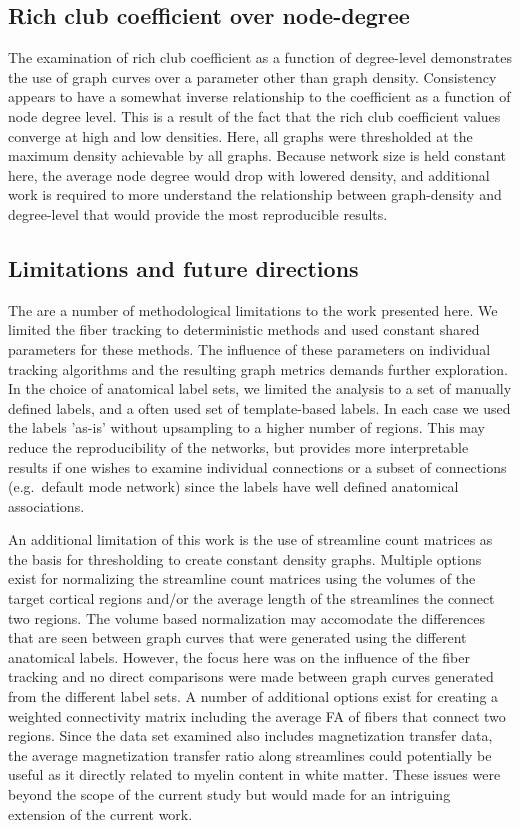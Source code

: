 \documentclass{frontiersSCNS} %
\begin{document}
\subsection{Rich club coefficient over node-degree}
The examination of rich club coefficient as a function of degree-level demonstrates the use of graph curves over 
a parameter other than graph density. Consistency appears to have a somewhat inverse relationship to the 
coefficient as a function of node degree level. This is a result of the fact that the rich club coefficient values converge
at high and low densities. Here, all graphs were thresholded at the maximum density achievable by all graphs. 
Because network size is held constant here, the average node degree would drop with lowered density, 
and additional work is required to more understand the relationship between graph-density and degree-level that 
would provide the most reproducible results. 

\subsection{Limitations and future directions}
The are a number of methodological limitations to the work presented here. We limited the fiber tracking to deterministic
methods and used constant shared parameters for these methods. The influence of these parameters on individual 
tracking algorithms and the resulting graph metrics demands further exploration. In the choice of anatomical label sets, we
limited the analysis to a set of manually defined labels, and a often used set of template-based labels. In each case we used the labels
'as-is' without upsampling to a higher number of regions. This may reduce the reproducibility of the networks, but provides
more interpretable results if one wishes to examine individual connections or a subset of connections (e.g.\ default mode network)
since the labels have well defined anatomical associations.

An additional limitation of this work is the use of streamline count matrices as the basis for thresholding to create constant
density graphs. Multiple options exist for normalizing the streamline count matrices using the volumes of 
the target cortical regions and/or the average length of the streamlines the connect two regions. The volume based
normalization may accomodate the differences that are seen between graph curves that were generated using 
the different anatomical labels. However, the focus here was on the influence of the fiber tracking and no direct
comparisons were made between graph curves generated from the different label sets. A number of additional options
exist for creating a weighted connectivity matrix including the average FA of fibers that connect two regions. Since the data set
examined also includes magnetization transfer data, the average magnetization transfer ratio along streamlines 
could potentially be useful as it directly related to myelin content in white matter. These issues were beyond the scope 
of the current study but would made for an intriguing extension of the current work. 
\end{document}
